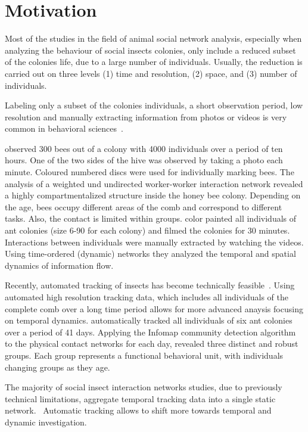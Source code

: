 \section{Motivation}
Most of the studies in the field of animal social network analysis, especially when analyzing the behaviour of social insects colonies, only include a reduced subset of the colonies life, due to a large number of individuals. Usually, the reduction is carried out on three levels (1) time and resolution, (2) space, and (3) number of individuals.

Labeling only a subset of the colonies individuals, a short observation period, low resolution and manually extracting information from photos or videos is very common in behavioral sciences~\cite{naug2008structure, quevillon2015social}.

\textcite{baracchi2014socio} observed 300 bees out of a colony with 4000 individuals over a period of ten hours. One of the two sides of the hive was observed by taking a photo each minute. Coloured numbered discs were used for individually marking bees. The analysis of a weighted und undirected worker-worker interaction network revealed a highly compartmentalized structure inside the honey bee colony. Depending on the age, bees occupy different areas of the comb and correspond to different tasks. Also, the contact is limited within groups. \textcite{blonder2011time} color painted all individuals of ant colonies (size 6-90 for each colony) and filmed the colonies for 30 minutes. Interactions between individuals were manually extracted by watching the videos. Using time-ordered (dynamic) networks they analyzed the temporal and spatial dynamics of information flow.

Recently, automated tracking of insects has become technically feasible~\cite{wario2015automatic, crall2015beetag, fiala2005comparing}.
Using automated high resolution tracking data, which includes all individuals of the complete comb over a long time period allows for more advanced anaysis focusing on temporal dynamics.
\textcite{mersch2013tracking} automatically tracked all individuals of six ant colonies over a period of 41 days. Applying the Infomap community detection algorithm to the physical contact networks for each day, revealed three distinct and robust groups. Each group represents a functional behavioral unit, with individuals changing groups as they age.

The majority of social insect interaction networks studies, due to previously technical limitations, aggregate temporal tracking data into a single static network.~\cite[Chapter~15]{krause2014animal}
Automatic tracking allows to shift more towards temporal and dynamic investigation.


